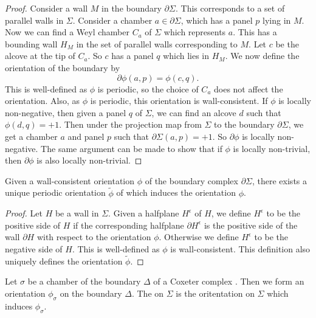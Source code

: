\documentclass[11pt]{article}
\begin{document}
\begin{proof}
    Consider a wall $M$ in the boundary $\partial\Sigma$. This corresponds to a set of parallel walls in $\Sigma$. Consider a chamber $a\in \partial\Sigma$, which has a panel $p$ lying in $M$. Now we can find a Weyl chamber $C_a$ of $\Sigma$ which represents $a$. This has a bounding wall $H_M$ in the set of parallel walls corresponding to $M$. Let $c$ be the alcove at the tip of $C_a$. So $c$ has a panel $q$ which lies in $H_M$. We now define the orientation of the boundary by 
    \[\partial \phi (a,p)= \phi (c,q).\]
    This is well-defined as $\phi$ is periodic, so the choice of $C_a$ does not affect the orientation. Also, as $\phi$ is periodic, this orientation is wall-consistent. 
    If $\phi$ is locally non-negative, then given a panel $q$ of $\Sigma$, we can find an alcove $d$ such that $\phi(d,q)=+1$. Then under the projection map from $\Sigma$ to the boundary $\partial\Sigma$, we get a chamber $a$ and panel $p$ such that $\partial\Sigma(a,p)=+1$. So $\partial\phi$ is locally non-negative. The same argument can be made to show that if $\phi$ is locally non-trivial, then $\partial\phi$ is also locally non-trivial. 
\end{proof}


\begin{lemma}
    Given a wall-consistent orientation $\phi$ of the boundary complex $\partial\Sigma$, there exists a unique periodic orientation $\tilde{\phi}$ of \sg which induces the orientation $\phi$. 
\end{lemma}

\begin{proof}
    Let $H$ be a wall in $\Sigma$. Given a halfplane $H^\epsilon$ of $H$, we define $H^\epsilon$ to be the positive side of $H$ if the corresponding halfplane $\partial H^\epsilon$ is the positive side of the wall $\partial H$ with respect to the orientation $\phi$. Otherwise we define $H^\epsilon$ to be the negative side of $H$. This is well-defined as $\phi$ is wall-consistent. This definition also uniquely defines the orientation $\tilde{\phi}$. 
\end{proof}

\begin{definition}
    Let $\sigma$ be a chamber of the boundary $\Delta$ of a Coxeter complex \sg. Then we form an orientation $\phi_{\sigma}$ on the boundary $\Delta$. The  on $\Sigma$ is the oritentation on $\Sigma$ which induces $\phi_{\sigma}$. 
\end{definition}
\end{document}
